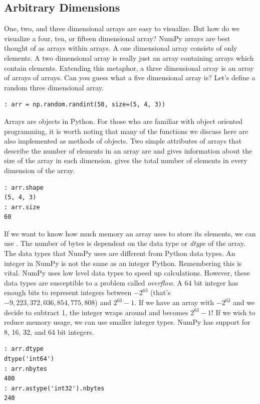 \subsection*{Arbitrary Dimensions}
One, two, and three dimensional arrays are easy to visualize.
But how do we visualize a four, ten, or fifteen dimensional array?
NumPy arrays are best thought of as arrays within arrays.
A one dimensional array consists of only elements.
A two dimensional array is really just an array containing arrays which contain elements.
Extending this metaphor, a three dimensional array is an array of arrays of arrays.
Can you guess what a five dimensional array is?
Let's define a random three dimensional array.
\begin{lstlisting}
: arr = np.random.randint(50, size=(5, 4, 3))
\end{lstlisting}
Arrays are objects in Python.
For those who are familiar with object oriented programming, it is worth noting that many of the functions we discuss here are also implemented as methods of  objects.
Two simple attributes of arrays that describe the number of elements in an array are  and 
 gives information about the size of the array in each dimension.
 gives the total number of elements in every dimension of the array.
\begin{lstlisting}
: arr.shape
(5, 4, 3)
: arr.size
60
\end{lstlisting}

If we want to know how much memory an array uses to store its elements, we can use .
The number of bytes is dependent on the data type or \emph{dtype} of the array.
The data types that NumPy uses are different from Python data types.
An integer in NumPy is not the same as an integer Python.
Remembering this is vital.
NumPy uses low level data types to speed up calculations.
However, these data types are susceptible to a problem called \emph{overflow}.
A 64 bit integer has enough bits to represent integers between $-2^{63}$ (that's $-9,223,372,036,854,775,808$) and $2^{63} - 1$.
If we have an array with $-2^{63}$ and we decide to subtract 1, the integer wraps around and becomes $2^{63} - 1$!  If we wish to reduce memory usage, we can use smaller integer types.
NumPy has support for 8, 16, 32, and 64 bit integers. 
\begin{lstlisting}
: arr.dtype
dtype('int64')
: arr.nbytes
480
: arr.astype('int32').nbytes
240
\end{lstlisting}

